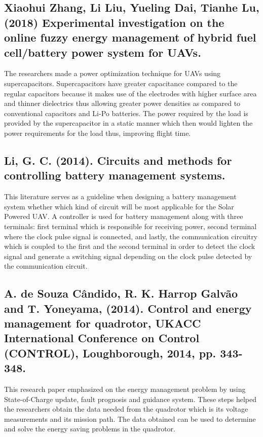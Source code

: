 \subsection{Xiaohui Zhang, Li Liu, Yueling Dai, Tianhe Lu, (2018) Experimental investigation on the online fuzzy energy management of hybrid fuel cell/battery power system for UAVs.}

The researchers made a power optimization technique for UAVs using supercapacitors. Supercapacitors have greater capacitance compared to the regular capacitors because it makes use of the electrodes with higher surface area and thinner dielectrics thus allowing greater power densities as compared to conventional capacitors and Li-Po batteries. The power required by the load is provided by the supercapacitor in a static manner which then would lighten the power requirements for the load thus, improving flight time.

\subsection{Li, G. C. (2014). Circuits and methods for controlling battery management systems.}

 This literature serves as a guideline when designing a battery management system whether which kind of circuit will be most applicable for the Solar Powered UAV. A controller is used for battery management along with three terminals: first terminal which is responsible for receiving power, second terminal where the clock pulse signal is connected, and lastly, the communication circuitry which is coupled to the first and the second terminal in order to detect the clock signal and generate a switching signal depending on the clock pulse detected by the communication circuit.
\subsection{A. de Souza Cândido, R. K. Harrop Galvão and T. Yoneyama, (2014).  Control and energy management for quadrotor, UKACC International Conference on Control (CONTROL), Loughborough, 2014, pp. 343-348. }
This research paper emphasized on the energy management problem by using State-of-Charge update, fault prognosis and guidance system. These steps helped the researchers obtain the data needed from the quadrotor which is its voltage measurements and its mission path. The data obtained can be used to determine and solve the energy saving problems in the quadrotor.







